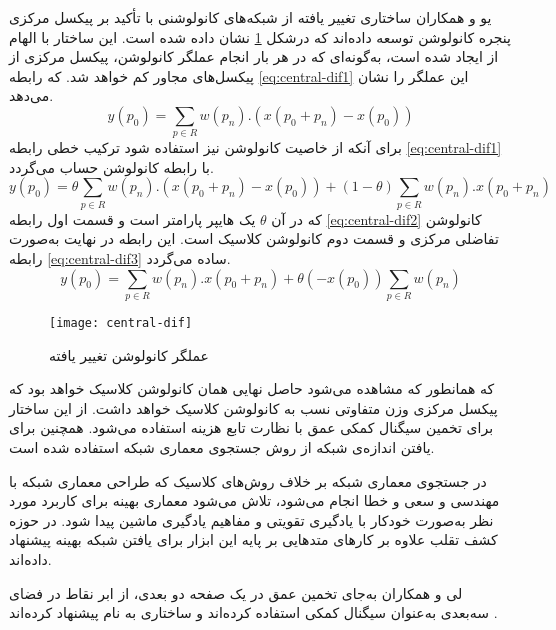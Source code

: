 یو و همکاران
\cite{yu2020searching}
ساختاری تغییر یافته از شبکه‌های کانولوشنی با تأکید بر پیکسل مرکزی پنجره کانولوشن توسعه داده‌اند که درشکل
\ref{fig:central-dif}
نشان داده شده است.
این ساختار با الهام از  ایجاد شده است، به‌گونه‌ای که در هر بار انجام عملگر کانولوشن، پیکسل مرکزی از پیکسل‌های مجاور کم خواهد شد. که رابطه
\ref{eq:central-dif1}
این عملگر را نشان می‌دهد.
\begin{equation}\label{eq:central-dif1}
	y(p_0) = \sum_{p \in R} w(p_n).(x(p_0+p_n)-x(p_0)) 
\end{equation}
برای آنکه از خاصیت کانولوشن نیز استفاده شود ترکیب خطی رابطه
\ref{eq:central-dif1}
با رابطه کانولوشن حساب می‌گردد.
\begin{equation}\label{eq:central-dif2}
	y(p_0) = \theta\sum_{p \in R} w(p_n).(x(p_0+p_n)-x(p_0)) +
	(1-\theta)\sum_{p \in R}w(p_n).x(p_0+p_n)
\end{equation}
که در آن
$\theta$
یک هایپر پارامتر است و قسمت اول رابطه
\ref{eq:central-dif2}
کانولوشن تفاضلی مرکزی و قسمت دوم کانولوشن کلاسیک است. این رابطه در نهایت به‌صورت رابطه
\ref{eq:central-dif3}
ساده می‌گردد.
\begin{equation}\label{eq:central-dif3}
	y(p_0) = \sum_{p \in R} {w(p_n).x(p_0+p_n)} +
	\theta(-x(p_0))\sum_{p \in R}{w(p_n)}
\end{equation}
\begin{figure}[h]
	\centerline{\texttt{[image: central-dif]}}
	\caption{عملگر کانولوشن تغییر یافته \cite{yu2020searching} }
	\label{fig:central-dif}
\end{figure}

که همانطور که مشاهده می‌شود حاصل نهایی همان کانولوشن کلاسیک خواهد بود که پیکسل مرکزی وزن متفاوتی نسب به کانولوشن کلاسیک خواهد داشت. از این ساختار برای تخمین سیگنال کمکی عمق با نظارت تابع هزینه   استفاده می‌شود. همچنین برای یافتن اندازه‌ی شبکه از روش جستجوی معماری شبکه 
 \cite{zoph2016neural}
استفاده شده است.

در جستجوی معماری شبکه بر خلاف روش‌های کلاسیک که طراحی معماری شبکه با مهندسی و سعی و خطا انجام می‌شود، تلاش می‌شود معماری بهینه برای کاربرد مورد نظر به‌صورت خودکار با یادگیری تقویتی و مفاهیم یادگیری ماشین پیدا شود. در حوزه کشف تقلب علاوه بر
\cite{zoph2016neural}
کارهای
\cite{yu2020fas,yu2020auto} 
متدهایی بر پایه این ابزار برای یافتن شبکه بهینه پیشنهاد داده‌اند.
 
 لی و همکاران به‌جای تخمین عمق در یک صفحه دو بعدی، از ابر نقاط در فضای سه‌بعدی به‌عنوان سیگنال کمکی استفاده کرده‌اند و ساختاری به نام  پیشنهاد کرده‌اند
\cite{li20203dpc}.
 
